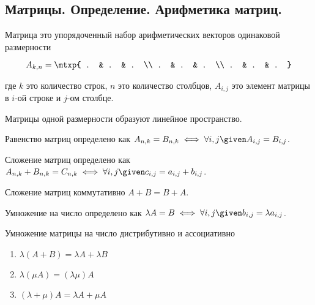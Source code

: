 \subsection{%
  Матрицы. Определение. Арифметика матриц.%
}

\begin{definition}
  Матрица это упорядоченный набор арифметических векторов одинаковой размерности
  
  \begin{equation*}
    A_{k, n} = \mtxp{
      . & . & . \\
      . & . & . \\
      . & . & .
    }
  \end{equation*}

  где \(k\) это количество строк, \(n\) это количество столбцов, \(A_{i, j}\)
  это элемент матрицы в \(i\)-ой строке и \(j\)-ом столбце.
\end{definition}

\begin{remark}
  Матрицы одной размерности образуют линейное пространство.
\end{remark}

\begin{remark}
  Равенство матриц определено как \(A_{n, k} = B_{n, k} \iff \forall i, j \given
  A_{i, j} = B_{i, j}\).
\end{remark}

\begin{remark}
  Сложение матриц определено как \(A_{n, k} + B_{n, k} = C_{n, k} \iff \forall
  i, j \given c_{i, j} = a_{i, j} + b_{i, j}\).
  
  Сложение матриц коммутативно \(A + B = B + A\).
\end{remark}

\begin{remark}
  Умножение на число определено как \(\lambda A = B \iff \forall i, j \given
  b_{i,j} = \lambda a_{i, j}\).
  
  Умножение матрицы на число дистрибутивно и ассоциативно
  
  \begin{enumerate}
  \item
    \(\lambda (A + B) = \lambda A + \lambda B\)
    
  \item
    \(\lambda (\mu A) = (\lambda \mu) A\)
    
  \item
    \((\lambda + \mu) A = \lambda A + \mu A\)
  \end{enumerate}
\end{remark}

